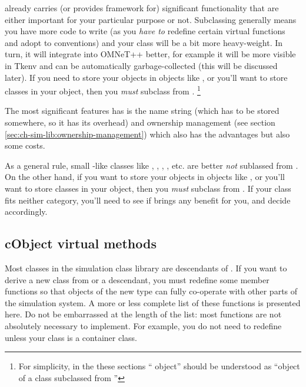  already carries (or provides framework for)
significant functionality that are either important for
your particular purpose or not. Subclassing 
generally means you have more code to write (as you \textit{have to}
redefine certain virtual functions and adopt to conventions)
and your class will be a bit more heavy-weight.
In turn, it will integrate into OMNeT++ better, for example
it will be more visible in Tkenv and can be automatically
garbage-collected (this will be discussed later). If you
need to store your objects in {\opp} objects like ,
or you'll want to store {\opp} classes in your object,
then you \textit{must} subclass from .
  \footnote{For simplicity, in the these sections ``{\opp} object''
  should be understood as ``object of a class subclassed from
  ''}

The most significant features  has is
the name string (which has to be stored somewhere, so it has
its overhead) and ownership management (see section
\ref{sec:ch-sim-lib:ownership-management}) which
also has the advantages but also some costs.

As a general rule, small -like classes like ,
, , , etc.
are better \textit{not} sublassed from .
On the other hand, if you want to store your objects in {\opp} objects
like , or you'll want to store {\opp} classes in your object,
then you \textit{must} subclass from .
If your class fits neither category, you'll need to
see if  brings any benefit for you, and
decide accordingly.


\subsection{cObject virtual methods}

Most classes in the simulation class library are descendants of
. If you want to derive a new class from
 or a  descendant, you must redefine
some member functions so that objects of the new type can fully
co-operate with other parts of the simulation system. A more or less
complete list of these functions is presented here. Do not be
embarrassed at the length of the list: most functions are not
absolutely necessary to implement. For example, you do not need to
redefine  unless your class is a container class.

